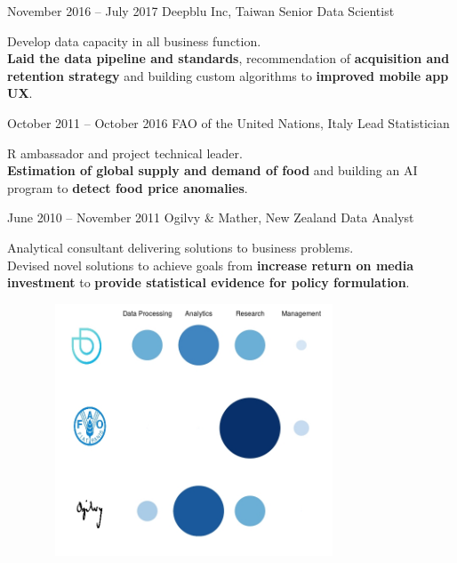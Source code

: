 \documentclass{tccv}
\begin{document}
\begin{eventlist}

\item{November 2016 -- July 2017}
  {Deepblu Inc, Taiwan}
  {Senior Data Scientist}

  Develop data capacity in all business function.\\

  \textbf{Laid the data pipeline and standards}, recommendation of
  \textbf{acquisition and retention strategy} and building custom
  algorithms to \textbf{improved mobile app UX}.\\


\item{October 2011 -- October 2016}
  {FAO of the United Nations, Italy}
  {Lead Statistician}

  R ambassador and project technical leader.\\
  
  \textbf{Estimation of global supply and demand of food} and building
  an AI program to \textbf{detect food price anomalies}. \\

\item{June 2010 -- November 2011}
     {Ogilvy \& Mather, New Zealand}
     {Data Analyst}

     Analytical consultant delivering solutions to business
     problems. \\

     Devised novel solutions to achieve goals from \textbf{increase
       return on media investment} to \textbf{provide statistical
       evidence for policy formulation}.


\end{eventlist}

\begin{figure}[h!] %
  \centering
  \includegraphics[width=9cm,height=7.5cm]{experience_association.jpeg}
\end{figure}
\end{document}
